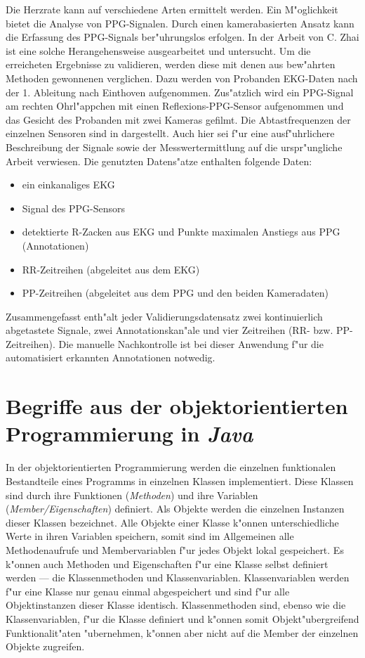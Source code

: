 Die Herzrate kann auf verschiedene Arten ermittelt werden.
Ein M"oglichkeit bietet die Analyse von \ac{PPG}-Signalen.
Durch einen kamerabasierten Ansatz kann die Erfassung des \ac{PPG}-Signals ber"uhrungslos erfolgen.
In der Arbeit von C. Zhai \cite{Zhai2012} ist eine solche Herangehensweise ausgearbeitet und untersucht.
Um die erreicheten Ergebnisse zu validieren, werden diese mit denen aus bew"ahrten Methoden gewonnenen verglichen.
Dazu werden von Probanden \ac{EKG}-Daten nach der 1. Ableitung nach Einthoven aufgenommen.
Zus"atzlich wird ein \ac{PPG}-Signal am rechten Ohrl"appchen mit einen Reflexions-\ac{PPG}-Sensor aufgenommen und das Gesicht des Probanden mit zwei Kameras gefilmt.
Die Abtastfrequenzen der einzelnen Sensoren sind in  dargestellt.
Auch hier sei f"ur eine ausf"uhrlichere Beschreibung der Signale sowie der Messwertermittlung auf die urspr"ungliche Arbeit \cite{Zhai2012} verwiesen.
Die genutzten Datens"atze enthalten folgende Daten:
\begin{itemize}
	\item ein einkanaliges \ac{EKG}
	\item Signal des \ac{PPG}-Sensors
	\item detektierte R-Zacken aus \ac{EKG} und Punkte maximalen Anstiegs aus \ac{PPG} (Annotationen)
	\item RR-Zeitreihen (abgeleitet aus dem \ac{EKG})
	\item PP-Zeitreihen (abgeleitet aus dem \ac{PPG} und den beiden Kameradaten)
\end{itemize}
Zusammengefasst enth"alt jeder Validierungsdatensatz zwei kontinuierlich abgetastete Signale, zwei Annotationskan"ale und vier Zeitreihen (RR- bzw. PP-Zeitreihen).
Die manuelle Nachkontrolle ist bei dieser Anwendung f"ur die automatisiert erkannten Annotationen notwedig.


\section{Begriffe aus der objektorientierten Programmierung in \emph{Java}}

In der objektorientierten Programmierung werden die einzelnen funktionalen Bestandteile eines Programms in einzelnen Klassen implementiert.
Diese Klassen sind durch ihre Funktionen (\emph{Methoden}) und ihre Variablen (\emph{Member/Eigenschaften}) definiert.
Als Objekte werden die einzelnen Instanzen dieser Klassen bezeichnet.
Alle Objekte einer Klasse k"onnen unterschiedliche Werte in ihren Variablen speichern, somit sind im Allgemeinen alle Methodenaufrufe und Membervariablen f"ur jedes Objekt lokal gespeichert.
Es k"onnen auch Methoden und Eigenschaften f"ur eine Klasse selbst definiert werden --- die Klassenmethoden und Klassenvariablen.
Klassenvariablen werden f"ur eine Klasse nur genau einmal abgespeichert und sind f"ur alle Objektinstanzen dieser Klasse identisch.
Klassenmethoden sind, ebenso wie die Klassenvariablen, f"ur die Klasse definiert und k"onnen somit Objekt"ubergreifend Funktionalit"aten "ubernehmen, k"onnen aber nicht auf die Member der einzelnen Objekte zugreifen.

